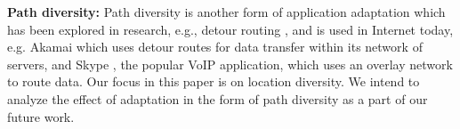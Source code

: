 


\noindent\textbf{Path diversity:}
Path diversity is another form of application adaptation which has been explored in research, e.g., detour routing  \cite{Detour}, and is used in Internet today, e.g. Akamai   \cite{Akamai} which uses detour routes for data transfer within its network of servers, and Skype \cite{Skype}, the popular VoIP application, which uses an overlay network to route data. Our focus in this paper is on location diversity. We intend to analyze the effect of adaptation in the form of path diversity as a part of our future work.


%

